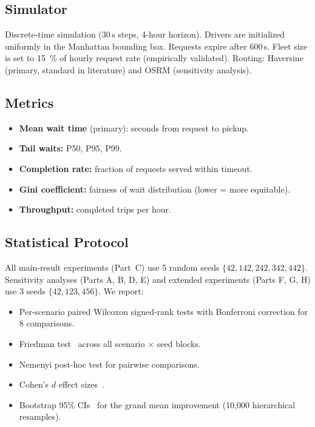 \documentclass[conference,10pt]{IEEEtran}
\begin{document}
\subsection{Simulator}

Discrete-time simulation (30\,s steps, 4-hour horizon). Drivers are
initialized uniformly in the Manhattan bounding box. Requests expire
after 600\,s. Fleet size is set to \SI{15}{\percent} of hourly request
rate (empirically validated). Routing: Haversine (primary, standard in
literature) and OSRM (sensitivity analysis).

\subsection{Metrics}

\begin{itemize}
  \item \textbf{Mean wait time} (primary): seconds from request to pickup.
  \item \textbf{Tail waits:} P50, P95, P99.
  \item \textbf{Completion rate:} fraction of requests served within timeout.
  \item \textbf{Gini coefficient:} fairness of wait distribution (lower = more equitable).
  \item \textbf{Throughput:} completed trips per hour.
\end{itemize}

\subsection{Statistical Protocol}

All main-result experiments (Part~C) use 5 random seeds
$\{42, 142, 242, 342, 442\}$. Sensitivity analyses (Parts A, B, D, E)
and extended experiments (Parts F, G, H) use 3 seeds $\{42, 123, 456\}$.
We report:
\begin{itemize}
  \item Per-scenario paired Wilcoxon signed-rank tests with Bonferroni
    correction for 8 comparisons.
  \item Friedman test~\cite{friedman1937use} across all scenario $\times$ seed blocks.
  \item Nemenyi post-hoc test for pairwise comparisons.
  \item Cohen's $d$ effect sizes~\cite{cohen1988statistical}.
  \item Bootstrap 95\% CIs~\cite{efron1993bootstrap} for the grand mean improvement
    (10,000 hierarchical resamples).
\end{itemize}
\end{document}
